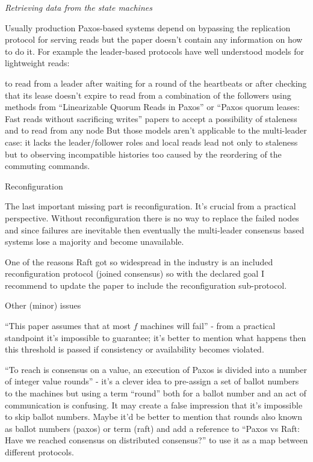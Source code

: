 \documentclass[letterpaper,twocolumn,10pt]{article}
\newenvironment{reviewerquote}
{\list{}{\leftmargin=\parindent\rightmargin=0in}\item[] \itshape \color{ReviewerDarkGray}}%
{\endlist}
\begin{document}
\begin{reviewerquote}
  Retrieving data from the state machines

  Usually production Paxos-based systems depend on bypassing the replication
  protocol for serving reads but the paper doesn't contain any information on
  how to do it. For example the leader-based protocols have well understood
  models for lightweight reads:

  to read from a leader after waiting for a round of the heartbeats or after
  checking that its lease doesn't expire to read from a combination of the
  followers using methods from ``Linearizable Quorum Reads in Paxos'' or
  ``Paxos quorum leases: Fast reads without sacrificing writes'' papers to
  accept a possibility of staleness and to read from any node But those models
  aren't applicable to the multi-leader case: it lacks the leader/follower
  roles and local reads lead not only to staleness but to observing
  incompatible histories too caused by the reordering of the commuting
  commands.

  Reconfiguration

  The last important missing part is reconfiguration. It's crucial from a
  practical perspective. Without reconfiguration there is no way to replace the
  failed nodes and since failures are inevitable then eventually the
  multi-leader consensus based systems lose a majority and become unavailable.

  One of the reasons Raft got so widespread in the industry is an included
  reconfiguration protocol (joined consensus) so with the declared goal I
  recommend to update the paper to include the reconfiguration sub-protocol.

  Other (minor) issues

  ``This paper assumes that at most $f$ machines will fail'' - from a practical
  standpoint it's impossible to guarantee; it's better to mention what happens
  then this threshold is passed if consistency or availability becomes
  violated.

  ``To reach is consensus on a value, an execution of Paxos is divided into a
  number of integer value rounds'' - it's a clever idea to pre-assign a set of
  ballot numbers to the machines but using a term ``round'' both for a ballot
  number and an act of communication is confusing. It may create a false
  impression that it's impossible to skip ballot numbers. Maybe it'd be better
  to mention that rounds also known as ballot numbers (paxos) or term (raft)
  and add a reference to ``Paxos vs Raft: Have we reached consensus on
  distributed consensus?'' to use it as a map between different protocols.
\end{reviewerquote}
\end{document}
